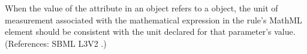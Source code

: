 When the value of the attribute  in an \AssignmentRule
object refers to a \Parameter object, the unit of measurement associated
with the mathematical expression in the rule's MathML  element
should be consistent with the unit declared for that parameter's value.
(References: SBML L3V2 .)

